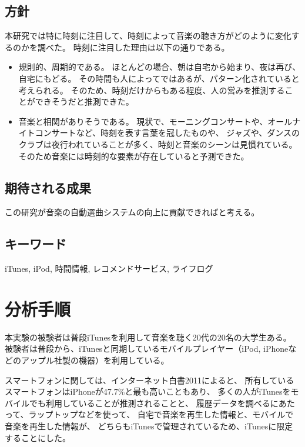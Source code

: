 \documentclass[11pt, twocolumn]{jsarticle}
\begin{document}
\subsection{方針}
本研究では特に時刻に注目して、時刻によって音楽の聴き方がどのように変化するのかを調べた。
時刻に注目した理由は以下の通りである。
\begin{itemize}
\item
規則的、周期的である。
ほとんどの場合、朝は自宅から始まり、夜は再び、自宅にもどる。
その時間も人によってではあるが、パターン化されていると考えられる。
そのため、時刻だけからもある程度、人の営みを推測することができそうだと推測できた。
\item
音楽と相関がありそうである。
現状で、モーニングコンサートや、オールナイトコンサートなど、時刻を表す言葉を冠したものや、
ジャズや、ダンスのクラブは夜行われていることが多く、時刻と音楽のシーンは見慣れている。
そのため音楽には時刻的な要素が存在していると予測できた。
\end{itemize}

\subsection{期待される成果}
この研究が音楽の自動選曲システムの向上に貢献できればと考える。
\subsection{キーワード}
iTunes, iPod, 時間情報, レコメンドサービス, ライフログ

\section{分析手順}
本実験の被験者は普段iTunesを利用して音楽を聴く20代の20名の大学生ある。
被験者は普段から、iTunesと同期しているモバイルプレイヤー（iPod, iPhoneなどのアップル社製の機器）を利用している。

スマートフォンに関しては、インターネット白書2011によると、
所有しているスマートフォンはiPhoneが47.7\%と最も高いこともあり、
多くの人がiTunesをモバイルでも利用していることが推測されることと、
履歴データを調べるにあたって、ラップトップなどを使って、
自宅で音楽を再生した情報と、モバイルで音楽を再生した情報が、
どちらもiTunesで管理されているため、iTunesに限定することにした。
\end{document}
